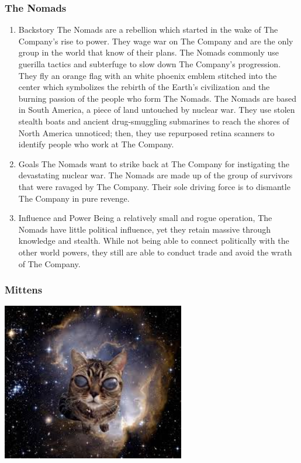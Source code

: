 \documentclass[11pt]{article}
\begin{document}
\subsubsection{The Nomads}
\label{sec:orgda2f6c6}

\begin{enumerate}
\item Backstory
\label{sec:org6e48524}
The Nomads are a rebellion which started in the wake of The Company's rise to power. They wage war on The Company and are the only group in the world that know of their plans. The Nomads commonly use guerilla tactics and subterfuge to slow down The Company's progression. They fly an orange flag with an white phoenix emblem stitched into the center which symbolizes the rebirth of the Earth's civilization and the burning passion of the people who form The Nomads. The Nomads are based in South America, a piece of land untouched by nuclear war. They use stolen stealth boats and ancient drug-smuggling submarines to reach the shores of North America unnoticed; then, they use repurposed retina scanners to identify people who work at The Company.

\item Goals
\label{sec:org8951607}
The Nomads want to strike back at The Company for instigating the devastating nuclear war. The Nomads are made up of the group of survivors that were ravaged by The Company. Their sole driving force is to dismantle The Company in pure revenge.

\item Influence and Power
\label{sec:org4e60479}
Being a relatively small and rogue operation, The Nomads have little political influence, yet they retain massive through knowledge and stealth. While not being able to connect politically with the other world powers, they still are able to conduct trade and avoid the wrath of The Company.
\end{enumerate}

\subsubsection{Mittens}
\label{sec:orgee2dcd7}
\begin{center}
\includegraphics[width=8cm]{./img/mittens.png}
\end{center}
\end{document}
